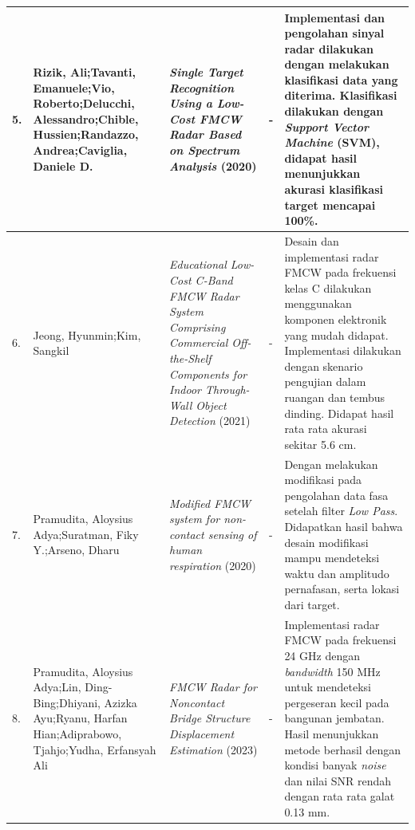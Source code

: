 \begin{center}
\begin{longtable}{|p{0.5cm}|p{2cm}|p{3cm}|p{2cm}|p{4cm}|}
	5.& Rizik, Ali;\newline Tavanti, Emanuele;\newline Vio, Roberto;\newline Delucchi, Alessandro;\newline Chible, Hussien;\newline Randazzo, Andrea;\newline Caviglia, Daniele D.
	& \textit{Single Target Recognition Using a Low-Cost FMCW Radar Based on Spectrum Analysis} (2020)
	& -
	& Implementasi dan pengolahan sinyal radar dilakukan dengan melakukan klasifikasi data yang diterima. Klasifikasi dilakukan dengan \textit{Support Vector Machine} (SVM), didapat hasil menunjukkan akurasi klasifikasi target mencapai 100\%. 
	\\ \hline
	
	6. & Jeong, Hyunmin;\newline Kim, Sangkil
	& \textit{Educational Low-Cost C-Band FMCW Radar System Comprising Commercial Off-the-Shelf Components for Indoor Through-Wall Object Detection} (2021)
	& -
	& Desain dan implementasi radar FMCW pada frekuensi kelas C dilakukan menggunakan komponen elektronik yang mudah didapat. Implementasi dilakukan dengan skenario pengujian dalam ruangan dan tembus dinding. Didapat hasil rata rata akurasi sekitar 5.6 cm. \\ \hline
	
	7. & Pramudita, Aloysius Adya;\newline Suratman, Fiky Y.;\newline Arseno, Dharu
	& \textit{Modified FMCW system for non-contact sensing of human respiration} (2020)
	& -
	& Dengan melakukan modifikasi pada pengolahan data fasa setelah filter \textit{Low Pass}. Didapatkan hasil bahwa desain modifikasi mampu mendeteksi waktu dan amplitudo pernafasan, serta lokasi dari target. 
	\\ \hline
	
	8. & Pramudita, Aloysius Adya;\newline Lin, Ding-Bing;\newline Dhiyani, Azizka Ayu;\newline Ryanu, Harfan Hian;\newline Adiprabowo, Tjahjo;\newline Yudha, Erfansyah Ali
	& \textit{FMCW Radar for Noncontact Bridge Structure Displacement Estimation} (2023)
	& -
	& Implementasi radar FMCW pada frekuensi 24 GHz dengan \textit{bandwidth} 150 MHz untuk mendeteksi pergeseran kecil pada bangunan jembatan. Hasil menunjukkan metode berhasil dengan kondisi banyak \textit{noise} dan nilai SNR rendah dengan rata rata galat 0.13 mm.
	\\ \hline
	

\end{longtable}
\end{center}
